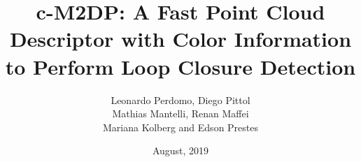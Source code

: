 \documentclass{beamer}
\begin{document}
\title[]{\MakeLowercase{c}-M2DP: A Fast Point Cloud Descriptor with Color Information to Perform Loop Closure Detection}


\date{August, 2019}

\author{\small Leonardo Perdomo, Diego Pittol \\ Mathias Mantelli, Renan Maffei \\ Mariana Kolberg and Edson Prestes}



\InfTitlePage

\end{document}
